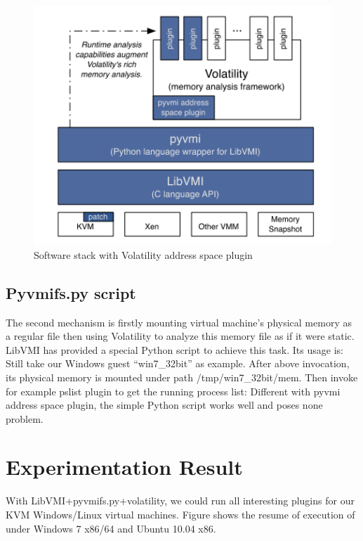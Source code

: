 \begin{figure}[htbp]
	\centering
		\includegraphics[width=14cm, height= 9cm ]{Figures/Figure30.png}
	\caption[Software stack with Volatility address space plugin]{Software stack with Volatility address space plugin \cite{Reference6}}
	\label{fig:Software stack with Volatility address space plugin}
\end{figure}

\subsection{Pyvmifs.py script}
The second mechanism is firstly mounting virtual machine’s physical memory as a regular file then using Volatility to analyze this 
memory file as if it were static. LibVMI has provided a special Python script to achieve this task. Its usage is:
Still take our Windows guest “win7\_32bit” as example. After above invocation, its physical memory is mounted under path 
/tmp/win7\_32bit/mem. Then invoke for example pslist plugin to get the running process list:
Different with pyvmi address space plugin, the simple Python script works well and poses none problem.

\section{Experimentation Result}
With LibVMI+pyvmifs.py+volatility, we could run all interesting plugins for our KVM Windows/Linux virtual machines. 
Figure shows the resume of execution of under Windows 7 x86/64 and Ubuntu 10.04 x86.

